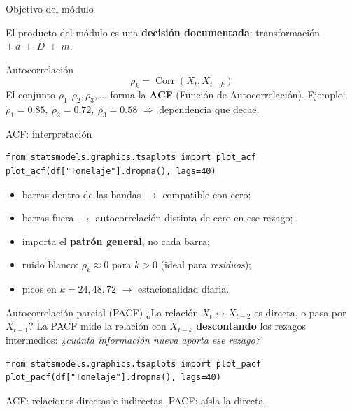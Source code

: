 



\begin{frame}{Objetivo del módulo}

El producto del módulo es una \textbf{decisión documentada}: transformación $+\ d\ +\ D\ +\ m$.
\end{frame}

\begin{frame}{Autocorrelación}
\[
\rho_k=\operatorname{Corr}(X_t,X_{t-k})
\]
El conjunto $\rho_1,\rho_2,\rho_3,\dots$ forma la \textbf{ACF} (Función de Autocorrelación).
Ejemplo: $\rho_1=0.85,\ \rho_2=0.72,\ \rho_3=0.58$ $\Rightarrow$ dependencia que decae.
\end{frame}

\begin{frame}[fragile]{ACF: interpretación}
\begin{lstlisting}
from statsmodels.graphics.tsaplots import plot_acf
plot_acf(df["Tonelaje"].dropna(), lags=40)
\end{lstlisting}
\begin{itemize}
  \item barras dentro de las bandas $\rightarrow$ compatible con cero;
  \item barras fuera $\rightarrow$ autocorrelación distinta de cero en ese rezago;
  \item importa el \textbf{patrón general}, no cada barra;
  \item ruido blanco: $\rho_k\approx0$ para $k>0$ (ideal para \emph{residuos});
  \item picos en $k=24,48,72$ $\rightarrow$ estacionalidad diaria.
\end{itemize}
\end{frame}

\begin{frame}[fragile]{Autocorrelación parcial (PACF)}
¿La relación $X_t\leftrightarrow X_{t-2}$ es directa, o pasa por $X_{t-1}$?
\vfill
La PACF mide la relación con $X_{t-k}$ \textbf{descontando} los rezagos intermedios:
\emph{¿cuánta información nueva aporta ese rezago?}
\begin{lstlisting}
from statsmodels.graphics.tsaplots import plot_pacf
plot_pacf(df["Tonelaje"].dropna(), lags=40)
\end{lstlisting}
ACF: relaciones directas e indirectas. PACF: aísla la directa.
\end{frame}

